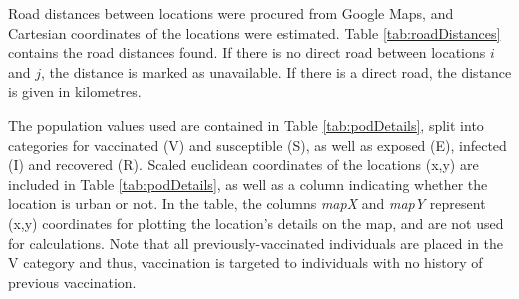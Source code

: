 Road distances between locations were procured from Google Maps, and Cartesian coordinates of the locations were estimated. Table \ref{tab:roadDistances} contains the road distances found. If there is no direct road between locations $i$ and $j$, the distance is marked as unavailable. If there is a direct road, the distance is given in kilometres.

\begin{table}[h]
\centering
{}
\caption{Distances by road between locations in the network (in kilometres).}
\label{tab:roadDistances}
\end{table}

The population values used are contained in Table \ref{tab:podDetails}, split into categories for vaccinated (V) and susceptible (S), as well as exposed (E), infected (I) and recovered (R). Scaled euclidean coordinates of the locations (x,y) are included in Table \ref{tab:podDetails}, as well as a column indicating whether the location is urban or not.  In the table, the columns \textit{mapX} and \textit{mapY} represent (x,y) coordinates for plotting the location's details on the map, and are not used for calculations. Note that all previously-vaccinated individuals are placed in the V category and thus, vaccination is targeted to individuals with no history of previous vaccination. 

